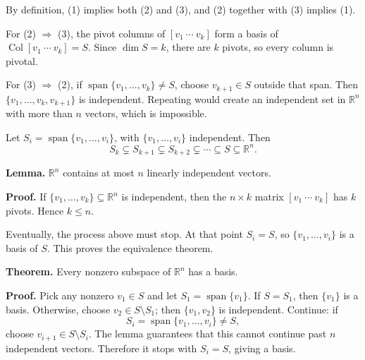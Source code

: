 \documentclass{article}
\begin{document}
\medskip

By definition, (1) implies both (2) and (3), and (2) together with (3) implies (1).

\medskip

For (2) $\Rightarrow$ (3), the pivot columns of $[v_1\ \cdots\ v_k]$ form a basis of $\operatorname{Col}[v_1\ \cdots\ v_k]=S$. Since $\dim S=k$, there are $k$ pivots, so every column is pivotal.

\medskip

For (3) $\Rightarrow$ (2), if $\operatorname{span}\{v_1,\ldots,v_k\}\neq S$, choose $v_{k+1}\in S$ outside that span. Then $\{v_1,\ldots,v_k,v_{k+1}\}$ is independent. Repeating would create an independent set in $\mathbb{R}^n$ with more than $n$ vectors, which is impossible.

\newpage

Let $S_i=\operatorname{span}\{v_1,\ldots,v_i\}$, with $\{v_1,\ldots,v_i\}$ independent. Then
\[
S_k\subsetneq S_{k+1}\subsetneq S_{k+2}\subsetneq\cdots\subseteq S\subseteq\mathbb{R}^n.
\]

\textbf{Lemma.} $\mathbb{R}^n$ contains at most $n$ linearly independent vectors.

\medskip

\textbf{Proof.} If $\{v_1,\ldots,v_k\}\subseteq\mathbb{R}^n$ is independent, then the $n\times k$ matrix $[v_1\ \cdots\ v_k]$ has $k$ pivots. Hence $k\leq n$.

\medskip

Eventually, the process above must stop. At that point $S_i=S$, so $\{v_1,\ldots,v_i\}$ is a basis of $S$. This proves the equivalence theorem.

\bigskip

\textbf{Theorem.} Every nonzero subspace of $\mathbb{R}^n$ has a basis.

\medskip

\textbf{Proof.} Pick any nonzero $v_1\in S$ and let $S_1=\operatorname{span}\{v_1\}$. If $S=S_1$, then $\{v_1\}$ is a basis. Otherwise, choose $v_2\in S\setminus S_1$; then $\{v_1,v_2\}$ is independent. Continue: if
\[
S_i=\operatorname{span}\{v_1,\ldots,v_i\}\neq S,
\]
choose $v_{i+1}\in S\setminus S_i$. The lemma guarantees that this cannot continue past $n$ independent vectors. Therefore it stops with $S_i=S$, giving a basis.
\end{document}

